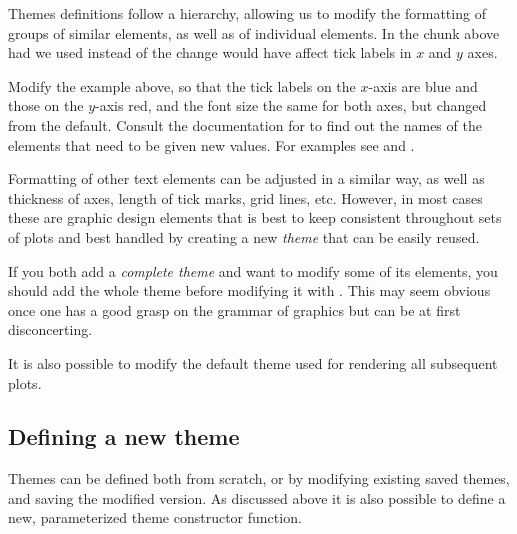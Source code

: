 \documentclass[krantz2]{krantz}\usepackage{knitr}%
\begin{document}
Themes definitions follow a hierarchy, allowing us to modify the formatting of groups of similar elements, as well as of individual elements. In the chunk above had we used  instead of  the change would have affect tick labels in $x$ and $y$ axes.

\begin{playground}
Modify the example above, so that the tick labels on the $x$-axis are blue and those on the $y$-axis red, and the font size the same for both axes, but changed from the default. Consult the documentation for  to find out the names of the elements that need to be given new values. For examples see  \autocite{Wickham2016} and  \autocite{Chang2018}.
\end{playground}

Formatting of other text elements can be adjusted in a similar way, as well as thickness of axes, length of tick marks, grid lines, etc. However, in most cases these are graphic design elements that is best to keep consistent throughout sets of plots and best handled by creating a new \emph{theme} that can be easily reused.

\begin{warningbox}
If you both add a \emph{complete theme} and want to modify some of its elements, you should add the whole theme before modifying it with . This may seem obvious once one has a good grasp on the grammar of graphics but can be at first disconcerting.
\end{warningbox}

It is also possible to modify the default theme used for rendering all subsequent plots.

\begin{knitrout}\footnotesize
{}\color{fgcolor}\begin{kframe}
\begin{alltt}
 \hlkwb{<-} \hlstd{(} \hlstd{=} \hlstd{(} \hlstd{=} \hlstd{))}
\end{alltt}
\end{kframe}
\end{knitrout}



\subsection{Defining a new theme}
Themes can be defined both from scratch, or by modifying existing saved themes, and saving the modified version. As discussed above it is also possible to define a new, parameterized theme constructor function.
\end{document}
